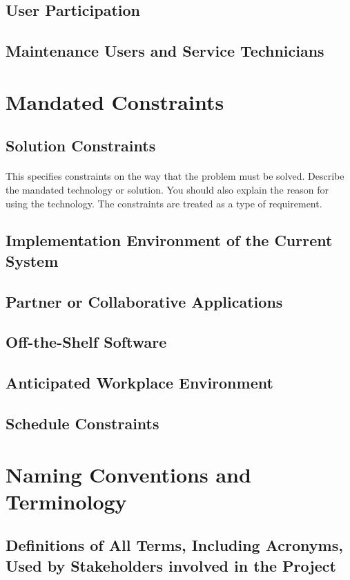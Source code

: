 \documentclass[12pt,a4paper]{article}
\begin{document}
\subsection{User Participation}
\subsection{Maintenance Users and Service Technicians}
\pagebreak
\section{Mandated Constraints}
\subsection{Solution Constraints}
\paragraph{}
This specifies constraints on the way that the problem must be solved. Describe the mandated technology or solution. You should also explain the reason for using the technology. The constraints are treated as a type of requirement.
\subsection{Implementation Environment of the Current System}
\subsection{Partner or Collaborative Applications}
\subsection{Off-the-Shelf Software}
\subsection{Anticipated Workplace Environment}
\subsection{Schedule Constraints}
\pagebreak
\section{Naming Conventions and Terminology}
\subsection{Definitions of All Terms, Including Acronyms, Used by Stakeholders involved in the Project}
\pagebreak
\end{document}
